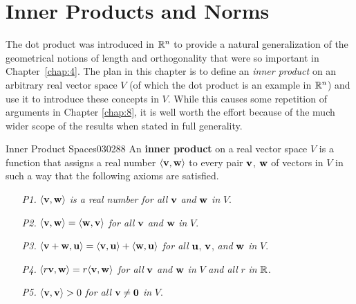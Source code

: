 \section{Inner Products and Norms}
\label{sec:10_1}

The dot product was introduced in $\mathbb{R}^n$ to provide a natural generalization of the geometrical notions of length and orthogonality that were so important in Chapter~\ref{chap:4}. The plan in this chapter is to define an \textit{inner product} on an arbitrary real vector space $V$ (of which the dot product is an example in $\mathbb{R}^n$) and use it to introduce these concepts in $V$. While this causes some repetition of arguments in Chapter \ref{chap:8}, it is well worth the effort because of the much wider scope of the results when stated in full generality. 

\begin{definition}{Inner Product Spaces}{030288}
An \textbf{inner product} on a real vector space $V$ is a function that assigns a real number $\langle\textbf{v}, \textbf{w}\rangle$ to every pair $\textbf{v}$, $\textbf{w}$ of vectors in $V$ in such a way that the following axioms are satisfied.
\end{definition}
\begin{itemize}
\item[\textit{P1.}]  $\langle\textbf{v}, \textbf{w}\rangle$ \textit{is a real number for all} $\textbf{v}$ \textit{and} $\textbf{w}$ \textit{in} $V$.

\item[\textit{P2.}]  $\langle\textbf{v}, \textbf{w}\rangle = \langle\textbf{w}, \textbf{v}\rangle$ \textit{for all} $\textbf{v}$ \textit{and} $\textbf{w}$ \textit{in} $V$.

\item[\textit{P3.}]  $\langle\textbf{v} + \textbf{w}, \textbf{u}\rangle = \langle\textbf{v}, \textbf{u}\rangle + \langle\textbf{w}, \textbf{u}\rangle$ \textit{for all} $\textbf{u}$, $\textbf{v}$, \textit{and} $\textbf{w}$ \textit{in} $V$.

\item[\textit{P4.}] $\langle r\textbf{v}, \textbf{w}\rangle = r\langle\textbf{v}, \textbf{w}\rangle$ \textit{for all} $\textbf{v}$ \textit{and} $\textbf{w}$ \textit{in} $V$ \textit{and all} $r$ \textit{in} $\mathbb{R}$.

\item[\textit{P5.}]  $\langle\textbf{v}, \textbf{v}\rangle > 0$ \textit{for all} $\textbf{v} \neq \textbf{0}$ \textit{in} $V$.

\end{itemize}

